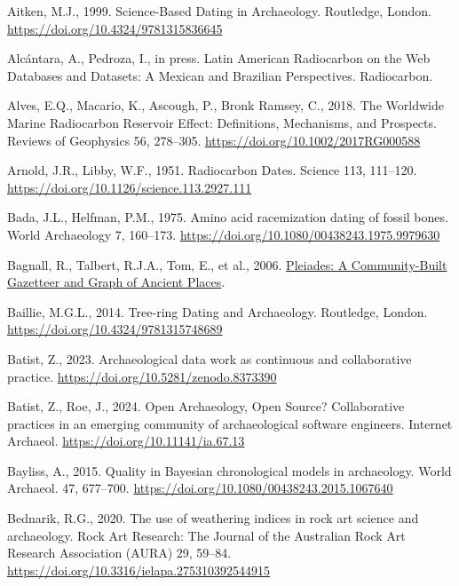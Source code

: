 \documentclass[
  number,
  doubleblind]{elsarticle}
\newlength{\cslhangindent}
\newenvironment{CSLReferences}[2] %
 {\begin{list}{}{%
  \setlength{\itemindent}{0pt}
  \setlength{\leftmargin}{0pt}
  \setlength{\parsep}{0pt}
  \ifodd #1
   \setlength{\leftmargin}{\cslhangindent}
   \setlength{\itemindent}{-1\cslhangindent}
  \fi
  \setlength{\itemsep}{#2\baselineskip}}}
 {\end{list}}
\begin{document}
\label{refs}
\begin{CSLReferences}{1}{0}
Aitken, M.J., 1999. Science-{Based Dating} in {Archaeology}. Routledge,
London. \url{https://doi.org/10.4324/9781315836645}

Alcántara, A., Pedroza, I., in press. Latin {American Radiocarbon} on
the {Web Databases} and {Datasets}: {A Mexican} and {Brazilian
Perspectives}. Radiocarbon.

Alves, E.Q., Macario, K., Ascough, P., Bronk Ramsey, C., 2018. The
{Worldwide Marine Radiocarbon Reservoir Effect}: {Definitions},
{Mechanisms}, and {Prospects}. Reviews of Geophysics 56, 278--305.
\url{https://doi.org/10.1002/2017RG000588}

Arnold, J.R., Libby, W.F., 1951. Radiocarbon {Dates}. Science 113,
111--120. \url{https://doi.org/10.1126/science.113.2927.111}

Bada, J.L., Helfman, P.M., 1975. Amino acid racemization dating of
fossil bones. World Archaeology 7, 160--173.
\url{https://doi.org/10.1080/00438243.1975.9979630}

Bagnall, R., Talbert, R.J.A., Tom, E., et al., 2006.
\href{https://pleiades.stoa.org/}{Pleiades: {A Community-Built
Gazetteer} and {Graph} of {Ancient Places}}.

Baillie, M.G.L., 2014. Tree-ring {Dating} and {Archaeology}. Routledge,
London. \url{https://doi.org/10.4324/9781315748689}

Batist, Z., 2023. Archaeological data work as continuous and
collaborative practice. \url{https://doi.org/10.5281/zenodo.8373390}

Batist, Z., Roe, J., 2024. Open {Archaeology}, {Open Source}?
{Collaborative} practices in an emerging community of archaeological
software engineers. Internet Archaeol.
\url{https://doi.org/10.11141/ia.67.13}

Bayliss, A., 2015. Quality in {Bayesian} chronological models in
archaeology. World Archaeol. 47, 677--700.
\url{https://doi.org/10.1080/00438243.2015.1067640}

Bednarik, R.G., 2020. The use of weathering indices in rock art science
and archaeology. Rock Art Research: The Journal of the Australian Rock
Art Research Association (AURA) 29, 59--84.
\url{https://doi.org/10.3316/ielapa.275310392544915}


\end{CSLReferences}
\end{document}
